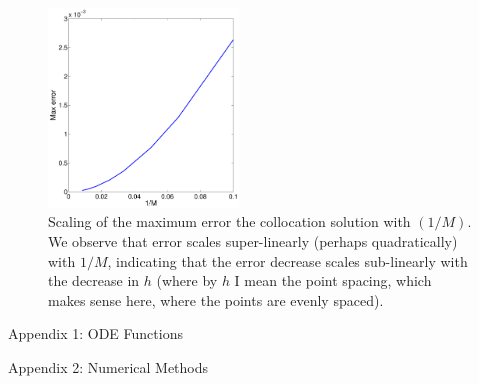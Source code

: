 \documentclass[11pt]{article}
\begin{document}
\begin{enumerate}
\begin{figure}[h!]
  \centering
    \includegraphics[width=0.45\textwidth]{andy_hw09_prb01_02.pdf}
  \caption{Scaling of the maximum error the collocation solution with $(1/M)$. We observe that error scales super-linearly (perhaps quadratically) with $1/M$, indicating that the error decrease scales sub-linearly with the decrease in $h$ (where by $h$ I mean the point spacing, which makes sense here, where the points are evenly spaced).}
\end{figure}

\end{enumerate}

\clearpage
\pagebreak
{\huge Appendix 1: ODE Functions}

\clearpage
\pagebreak
{\huge Appendix 2: Numerical Methods}

\end{document}
